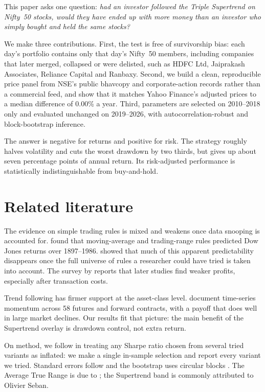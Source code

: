 \documentclass[11pt]{article}
\begin{document}
This paper asks one question: \emph{had an investor followed the Triple Supertrend on Nifty~50 stocks, would they
have ended up with more money than an investor who simply bought and held the same stocks?}

We make three contributions. First, the test is free of survivorship bias: each day's portfolio contains only
that day's Nifty~50 members, including companies that later merged, collapsed or were delisted, such as HDFC Ltd,
Jaiprakash Associates, Reliance Capital and Ranbaxy. Second, we build a clean, reproducible price panel from
NSE's public bhavcopy and corporate-action records rather than a commercial feed, and show that it matches
Yahoo Finance's adjusted prices to a median difference of 0.00\% a year. Third, parameters are selected on
2010--2018 only and evaluated unchanged on 2019--2026, with autocorrelation-robust and block-bootstrap inference.

The answer is negative for returns and positive for risk. The strategy roughly halves volatility and cuts the
worst drawdown by two thirds, but gives up about seven percentage points of annual return. Its risk-adjusted
performance is statistically indistinguishable from buy-and-hold.

\section{Related literature}

The evidence on simple trading rules is mixed and weakens once data snooping is accounted for.
\citet{brock1992simple} found that moving-average and trading-range rules predicted Dow Jones returns over
1897--1986. \citet{sullivan1999data} showed that much of this apparent predictability disappears once the full
universe of rules a researcher could have tried is taken into account. The survey by \citet{park2007what} reports
that later studies find weaker profits, especially after transaction costs.

Trend following has firmer support at the asset-class level. \citet{moskowitz2012time} document time-series
momentum across 58 futures and forward contracts, with a payoff that does well in large market declines. Our
results fit that picture: the main benefit of the Supertrend overlay is drawdown control, not extra return.

On method, we follow \citet{bailey2014deflated} in treating any Sharpe ratio chosen from several tried variants
as inflated: we make a single in-sample selection and report every variant we tried. Standard errors follow
\citet{newey1987simple} and the bootstrap uses circular blocks \citep{politis1992circular}. The Average True Range
is due to \citet{wilder1978new}; the Supertrend band is commonly attributed to Olivier Seban.
\end{document}
